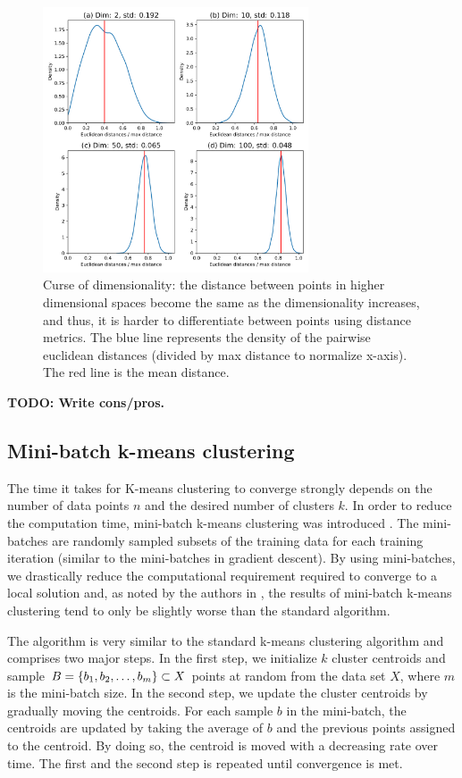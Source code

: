 \begin{figure}[H]
    \centering
    \includegraphics[width=0.7\textwidth]{thesis/figures/curse-of-dimensionality.pdf}
    \caption{Curse of dimensionality: the distance between points in higher dimensional spaces become the same as the dimensionality increases, and thus, it is harder to differentiate between points using distance metrics. The blue line represents the density of the pairwise euclidean distances (divided by max distance to normalize x-axis). The red line is the mean distance.}
    \label{fig:curse-of-dimensionality}
\end{figure}

\textbf{TODO: Write cons/pros.}

\subsection{Mini-batch k-means clustering}
\label{sec:mini-batch-k-means-clustering}
The time it takes for K-means clustering to converge strongly depends on the number of data points $n$ and the desired number of clusters $k$. In order to reduce the computation time, mini-batch k-means clustering was introduced \cite{sculley2010}. The mini-batches are randomly sampled subsets of the training data for each training iteration (similar to the mini-batches in gradient descent). By using mini-batches, we drastically reduce the computational requirement required to converge to a local solution and, as noted by the authors in \cite{sculley2010}, the results of mini-batch k-means clustering tend to only be slightly worse than the standard algorithm.

The algorithm is very similar to the standard k-means clustering algorithm and comprises two major steps. In the first step, we initialize $k$ cluster centroids and sample $B=\left\{b_1, b_2, \ldots, b_m\right\} \subset X$ points at random from the data set $X$, where $m$ is the mini-batch size. In the second step, we update the cluster centroids by gradually moving the centroids. For each sample $b$ in the mini-batch, the centroids are updated by taking the average of $b$ and the previous points assigned to the centroid. By doing so, the centroid is moved with a decreasing rate over time. The first and the second step is repeated until convergence is met.

